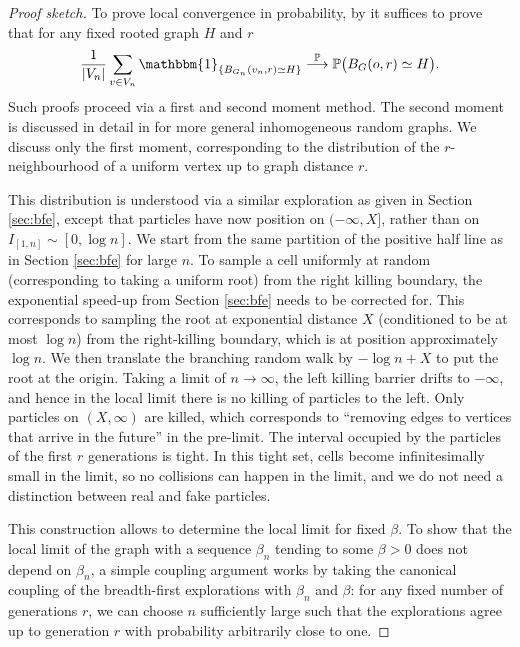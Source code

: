 \documentclass[a4paper, a4wide, 10pt, reqno]{amsart}
\theoremstyle{plain}
\theoremstyle{definition}
\numberwithin{equation}{section}
\newcommand{\Prob}{\mathbb{P}}
\newcommand{\ind}[1]{\mathbbm{1}_{\{#1\}}}
\begin{document}
\begin{proof}[Proof sketch]
To prove local convergence in probability, by \cite[Theorem 2.15]{vdH2} it suffices to prove that for any fixed rooted graph $H$ and $r$
\[
\frac{1}{|V_n|}\sum_{v\in V_n}\ind{B_{G_n}(v_n, r)\simeq H} \overset{\Prob}\longrightarrow \Prob\big(B_G(o, r)\simeq H\big).
\]
Such proofs proceed via a first and second moment method. The second moment is discussed in detail in \cite[Section 3]{vdH2} for more general inhomogeneous random graphs. We discuss only the first moment, corresponding to the distribution of the $r$-neighbourhood of a uniform vertex up to graph distance $r$.\smallskip

This distribution is understood via a similar exploration as given in Section \ref{sec:bfe}, except that particles have now position on $(-\infty, X]$, rather than on $I_{[1,n]}\sim[0, \log n]$. We start from the same partition of the positive half line as in Section \ref{sec:bfe} for large $n$. To sample a cell uniformly at random (corresponding to taking a uniform root) from the right killing boundary, the exponential speed-up from Section \ref{sec:bfe} needs to be corrected for. This corresponds to sampling the root at exponential distance $X$ (conditioned to be at most $\log n$) from the right-killing boundary, which is at position approximately $\log n$. We then translate the branching random walk by $-\log n + X$ to put the root at the origin.
Taking a limit of $n\to\infty$, the left killing barrier drifts to $-\infty$, and hence in the local limit there is no killing of particles to the left. Only particles on $(X,\infty)$ are killed, which corresponds to ``removing edges to vertices that arrive in the future'' in the pre-limit. The interval occupied by the particles of the first $r$ generations is tight. In this tight set, cells become infinitesimally small in the limit, so no collisions can happen in the limit, and we do not need a distinction between real and fake particles. \smallskip

This construction allows to determine the local limit for fixed $\beta$. To show that the local limit of the graph with a sequence $\beta_n$ tending to some $\beta>0$ does not depend on $\beta_n$, a simple coupling argument works by taking the canonical coupling of the breadth-first explorations with $\beta_n$ and $\beta$: for any fixed number of generations $r$, we can choose $n$ sufficiently large such that the explorations agree up to generation $r$ with probability arbitrarily close to one.     
\end{proof}
\end{document}
